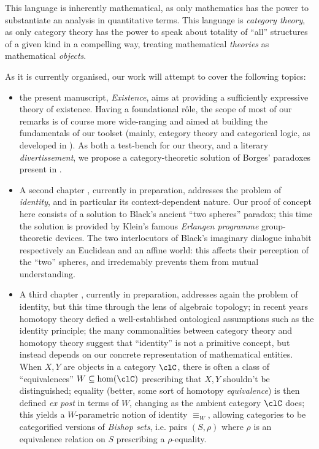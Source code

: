 This language is inherently mathematical, as only mathematics has the power to substantiate an analysis in quantitative terms. This language is \emph{category theory}, as only category theory has the power to speak about totality of ``all'' structures of a given kind in a compelling way, treating mathematical \emph{theories} as mathematical \emph{objects}.%

As it is currently organised, our work will attempt to cover the following topics:
\begin{itemize}
	\item the present manuscript, \emph{Existence}, aims at providing a sufficiently expressive theory of existence. Having a foundational r\^ole, the scope of most of our remarks is of course more wide-ranging and aimed at building the fundamentals of our toolset (mainly, category theory and categorical logic, as developed in \cite{mac1992sheaves,JohnstonePT,lambek1988introduction}). As both a test-bench for our theory, and a literary \emph{divertissement}, we propose a category-theoretic solution of Borges' paradoxes present in \cite{fictions}.
	\item A second chapter \cite{black}, currently in preparation, addresses the problem of \emph{identity}, and in particular its context-dependent nature. Our proof of concept here consists of a solution to Black's ancient ``two spheres'' paradox; this time the solution is provided by Klein's famous \emph{Erlangen programme} group-theoretic devices. The two interlocutors of Black's imaginary dialogue inhabit respectively an Euclidean and an affine world: this affects their perception of the ``two'' spheres, and irredemably prevents them from mutual understanding.
	\item A third chapter \cite{homot}, currently in preparation, addresses again the problem of identity, but this time through the lens of algebraic topology; in recent years homotopy theory defied a well\hyp{}established ontological assumptions such as the identity principle; the many commonalities between category theory and homotopy theory suggest that ``identity'' is not a primitive concept, but instead depends on our concrete representation of mathematical entities. When $X,Y$ are objects in a category $\clC$, there is often a class of ``equivalences'' $W \subseteq \hom(\clC)$ prescribing that $X,Y$ shouldn't be distinguished; equality (better, some sort of homotopy \emph{equivalence}) is then defined \emph{ex post} in terms of $W$, changing as the ambient category $\clC$ does; this yields a $W$-parametric notion of identity $\equiv_W$, allowing categories to be categorified versions of \emph{Bishop sets}, i.e. pairs $(S,\rho)$ where $\rho$ is an equivalence relation on $S$ prescribing a $\rho$-equality.
\end{itemize}
